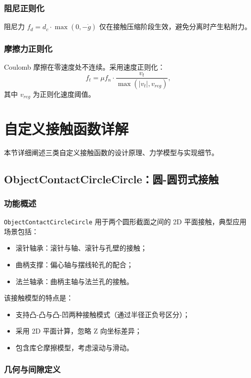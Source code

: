 \documentclass[12pt]{ctexart}
\begin{document}
\subsubsection{阻尼正则化}
阻尼力 $f_d = d_c \cdot \max(0, -\dot g)$ 仅在接触压缩阶段生效，避免分离时产生粘附力。

\subsubsection{摩擦力正则化}
Coulomb 摩擦在零速度处不连续。采用速度正则化：
\begin{equation}
f_t = \mu f_n \cdot \frac{v_t}{\max(|v_t|, v_{reg})},
\end{equation}
其中 $v_{reg}$ 为正则化速度阈值。

\section{自定义接触函数详解}

本节详细阐述三类自定义接触函数的设计原理、力学模型与实现细节。

\subsection{ObjectContactCircleCircle：圆-圆罚式接触}

\subsubsection{功能概述}

\texttt{ObjectContactCircleCircle} 用于两个圆形截面之间的 2D 平面接触，典型应用场景包括：
\begin{itemize}
  \item 滚针轴承：滚针与轴、滚针与孔壁的接触；
  \item 曲柄支撑：偏心轴与摆线轮孔的配合；
  \item 法兰轴承：曲柄主轴与法兰孔的接触。
\end{itemize}

该接触模型的特点是：
\begin{itemize}
  \item 支持凸-凸与凸-凹两种接触模式（通过半径正负号区分）；
  \item 采用 2D 平面计算，忽略 Z 向坐标差异；
  \item 包含库仑摩擦模型，考虑滚动与滑动。
\end{itemize}

\subsubsection{几何与间隙定义}
\end{document}
